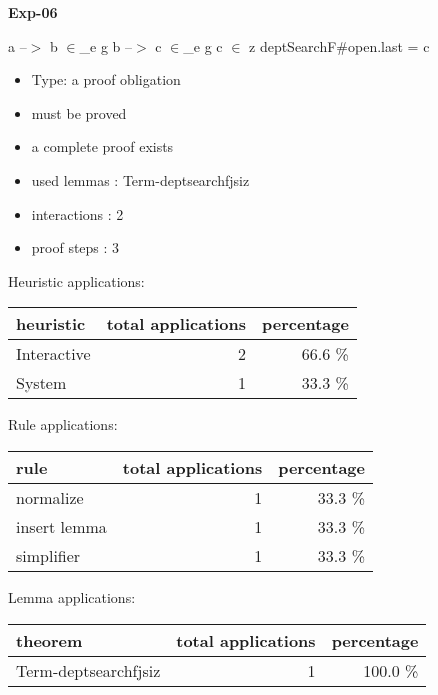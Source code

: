 \documentclass[a4paper]{article}
\begin{document}
{\LARGE\bf Exp-06}\label{lemma-Exp-06}

\medskip

 \Fol a --$>$ b $\in$\_e g \And b --$>$ c $\in$\_e g \And c $\in$ z \Imp \Do deptSearchF\#\Dc open.last = c

\begin{itemize}

\item Type: a proof obligation

\item       must be proved
\item       a complete proof exists
\item       used lemmas  : Term-deptsearchfjsiz
\item       interactions : 2
\item       proof steps  : 3
\end{itemize}

\medskip


Heuristic applications:

\begin{supertabular}{l|r|r}
heuristic	& total applications & percentage \\ \hline
Interactive & 2 & 66.6 \% \\
System & 1 & 33.3 \% \\

\end{supertabular}

Rule applications:

\begin{supertabular}{l|r|r}
rule	        & total applications & percentage \\ \hline
normalize & 1 & 33.3 \% \\
insert lemma & 1 & 33.3 \% \\
simplifier & 1 & 33.3 \% \\

\end{supertabular}

Lemma applications:

\begin{supertabular}{l|r|r}
theorem	        & total applications & percentage \\ \hline
Term-deptsearchfjsiz & 1 & 100.0 \% \\

\end{supertabular}
\end{document}
